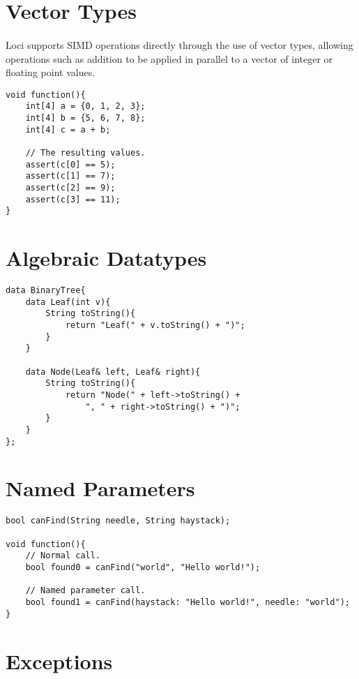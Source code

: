 \documentclass[12pt,twoside,notitlepage]{report}
\begin{document}
\section{Vector Types}

\paragraph{}
Loci supports SIMD operations directly through the use of vector types, allowing operations such as addition to be applied in parallel to a vector of integer or floating point values.

\small{
\begin{verbatim}
void function(){
    int[4] a = {0, 1, 2, 3};
    int[4] b = {5, 6, 7, 8};
    int[4] c = a + b;
    
    // The resulting values.
    assert(c[0] == 5);
    assert(c[1] == 7);
    assert(c[2] == 9);
    assert(c[3] == 11);
}
\end{verbatim}
}

\section{Algebraic Datatypes}

\small{
\begin{verbatim}
data BinaryTree{
    data Leaf(int v){
        String toString(){
            return "Leaf(" + v.toString() + ")";
        }
    }
    
    data Node(Leaf& left, Leaf& right){
        String toString(){
            return "Node(" + left->toString() +
                ", " + right->toString() + ")";
        }
    }
};
\end{verbatim}
}

\section{Named Parameters}

\small{
\begin{verbatim}
bool canFind(String needle, String haystack);

void function(){
    // Normal call.
    bool found0 = canFind("world", "Hello world!");
    
    // Named parameter call.
    bool found1 = canFind(haystack: "Hello world!", needle: "world");
}
\end{verbatim}
}

\section{Exceptions}
\end{document}
